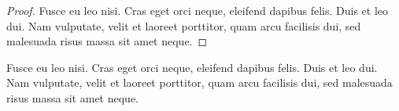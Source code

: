 \documentclass[a4paper,german]{tui-algo-seminar}
\begin{document}
\begin{proof}
Fusce eu leo nisi. Cras eget orci neque, eleifend dapibus felis. Duis et leo dui. Nam vulputate, velit et laoreet porttitor, quam arcu facilisis dui, sed malesuada risus massa sit amet neque.
\end{proof}

\begin{claimproof}
Fusce eu leo nisi. Cras eget orci neque, eleifend dapibus felis. Duis et leo dui. Nam vulputate, velit et laoreet porttitor, quam arcu facilisis dui, sed malesuada risus massa sit amet neque.
\end{claimproof}
\end{document}
